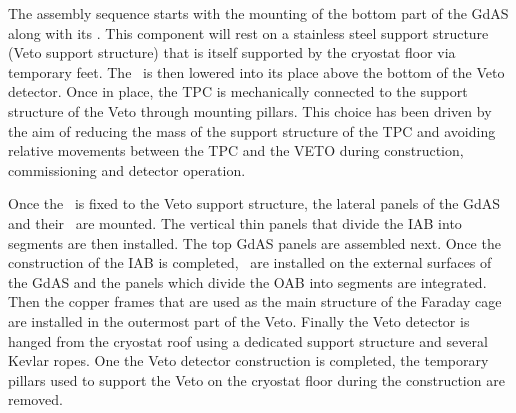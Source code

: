 The assembly sequence starts with the mounting of the bottom part of the GdAS along with its \DSkPdms. This component will rest on a stainless steel support structure (Veto support structure) that is itself supported by the cryostat floor via temporary feet. The \TPC\ is then lowered into its place above the bottom of the Veto detector. Once in place, the TPC is mechanically connected to the support structure of the Veto through mounting pillars. This choice has been driven by the aim of reducing the mass of the support structure of the TPC and avoiding relative movements between the TPC and the VETO during construction, commissioning and detector operation. 

Once the \TPC\ is fixed to the Veto support structure, the lateral panels of the GdAS and their \DSkPdms\ are mounted.  The vertical thin panels that divide the IAB into segments are then installed. The top GdAS panels are assembled next. Once the construction of the IAB is completed, \DSkPdms\ are installed on the external surfaces of the GdAS and the panels which divide the OAB into segments are integrated. Then the copper frames that are used as the main structure of the Faraday cage are installed in the outermost part of the Veto. Finally the Veto detector is hanged from the cryostat roof using a dedicated support structure and several Kevlar ropes. One the Veto detector construction is completed, the temporary pillars used to support the Veto on the cryostat floor during the construction are removed. 

